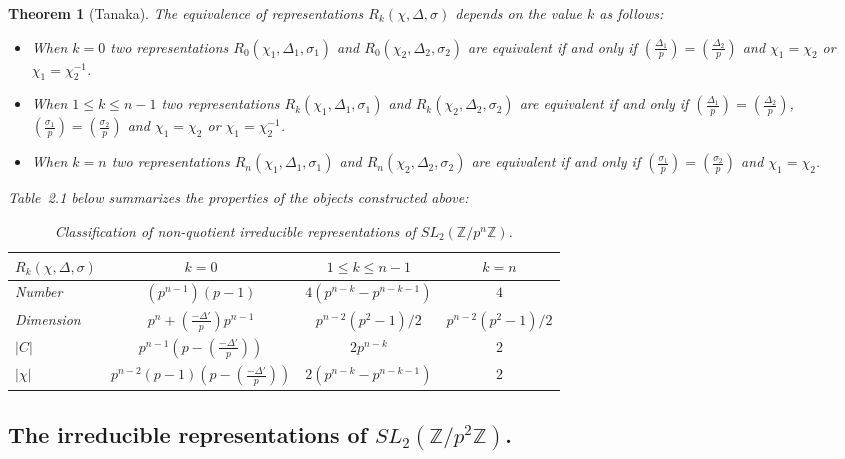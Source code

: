 \documentclass[12pt,reqno]{amsart}
\newtheorem{theorem}{Theorem}[section]
\theoremstyle{remark}
\numberwithin{table}{section}
\newcommand{\Z}{\mathbb Z}
\begin{document}
\begin{theorem}[Tanaka]
The equivalence of representations $R_k(\chi,\Delta,\sigma)$ depends on the value $k$ as follows:

\begin{itemize}
\item[(i)] When $k=0$ two representations $R_0(\chi_1,\Delta_1,\sigma_1)$ and  $R_0(\chi_2,\Delta_2,\sigma_2)$ are equivalent if and only if $\left ( \frac{\Delta_1}{p} \right ) = \left ( \frac{\Delta_2}{p} \right )$ and $\chi_1=\chi_2$ or $\chi_1=\chi_2^{-1}$.

\item[(iii)]  When $1\leq k\leq n-1$  two representations $R_k(\chi_1,\Delta_1,\sigma_1)$ and  $R_k(\chi_2,\Delta_2,\sigma_2)$ are equivalent if and only if $\left ( \frac{\Delta_1}{p} \right ) = \left ( \frac{\Delta_2}{p} \right )$, $\left ( \frac{\sigma_1}{p} \right ) = \left ( \frac{\sigma_2}{p} \right )$ and $\chi_1=\chi_2$ or $\chi_1=\chi_2^{-1}$.

\item[(iii)]   When $k=n$ two representations $R_n(\chi_1,\Delta_1,\sigma_1)$ and  $R_n(\chi_2,\Delta_2,\sigma_2)$ are equivalent if and only if $\left ( \frac{\sigma_1}{p} \right ) = \left ( \frac{\sigma_2}{p} \right )$ and $\chi_1 = \chi_2$.
\end{itemize}
Table~2.1 below summarizes the properties of the objects constructed above:
\begin{table}[!h]
\begin{tabular}{|l|c|c|c|}
\hline
$R_k(\chi,\Delta,\sigma)$&$k=0$&$1\leq k\leq n-1$&$k=n$\\
\hline
Number&$(p^{n-1})(p-1)$&$4(p^{n-k}-p^{n-k-1})$&$4$\\
\hline
Dimension&$p^n+  ( \frac{-\Delta'}{p} )p^{n-1}$&$p^{n-2}(p^2-1)/2$&$p^{n-2}(p^2-1)/2$\\
\hline
$|C|$&$p^{n-1}(p- (\frac{-\Delta'}{p} ))$&$2p^{n-k}$&$2$\\ 
\hline
$|\chi|$&$p^{n-2}(p-1) (p- (\frac{-\Delta'}{p} ) )$&$2(p^{n-k}-p^{n-k-1})$&$2$\\
\hline

\end{tabular}\label{tbl:pnreps}
\caption{Classification of non-quotient irreducible representations of $SL_2(\Z/p^n\Z)$.}

\end{table}
\end{theorem}

\subsection{The irreducible representations of $SL_2(\Z/p^2\Z)$.}
\end{document}
